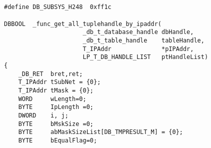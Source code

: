 ﻿\documentclass  [11pt,twocolumn]{article}
\begin{document}
\subsection{}
\begin{lstlisting}
#define DB_SUBSYS_H248  0xff1c

DBBOOL  _func_get_all_tuplehandle_by_ipaddr(
                      _db_t_database_handle dbHandle,
                      _db_t_table_handle    tableHandle,
                      T_IPAddr              *pIPAddr,
                      LP_T_DB_HANDLE_LIST   ptHandleList)
{
    _DB_RET  bret,ret;
    T_IPAddr tSubNet = {0};
    T_IPAddr tMask = {0};
    WORD     wLength=0;
    BYTE     IpLength =0;
    DWORD    i, j;
    BYTE     bMskSize =0;
    BYTE     abMaskSizeList[DB_TMPRESULT_M] = {0};
    BYTE     bEqualFlag=0;


\end{lstlisting}
\end{document}
